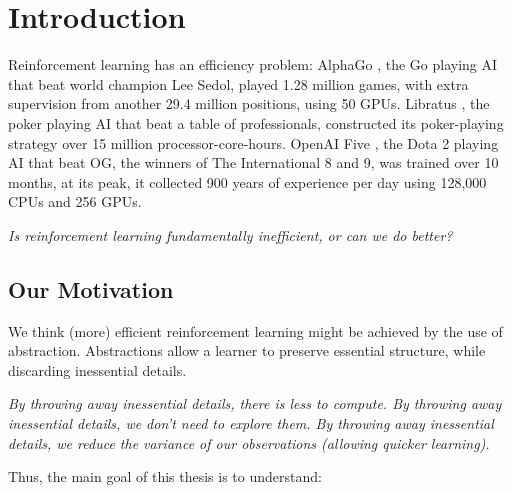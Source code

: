 \chapter{Introduction}\label{C:intro}

Reinforcement learning has an efficiency problem: AlphaGo \cite{Silver2016a}, the Go
playing AI that beat world champion Lee Sedol, played 1.28 million games, with
extra supervision from another 29.4 million positions, using 50 GPUs.
Libratus \cite{Brown2018b}, the poker playing AI that beat a table of professionals,
constructed its poker-playing strategy over 15 million processor-core-hours.
OpenAI Five \cite{Berner2019}, the Dota 2 playing AI that beat OG, the winners of The International 8 and 9, was
trained over 10 months, at its peak, it collected 900 years of experience per day using
128,000 CPUs and 256 GPUs.

\begin{displayquote}
\textit{Is reinforcement learning fundamentally inefficient, or can we do better?}
\end{displayquote}


\section{Our Motivation}

We think (more) efficient reinforcement learning might be achieved by the use of abstraction.
Abstractions allow a learner to preserve essential structure, while discarding inessential details.

\begin{displayquote}
\textit{By throwing away inessential details, there is less to compute. \newline
By throwing away inessential details, we don't need to explore them. \newline
By throwing away inessential details, we reduce the variance of our \newline
observations (allowing quicker learning).}
\end{displayquote}

%
%
%

Thus, the main goal of this thesis is to understand:

